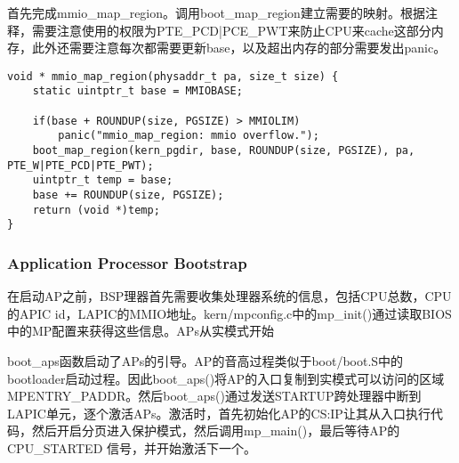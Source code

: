 \begin{exerciseSolution}{1}
    \par 首先完成mmio\_map\_region。调用boot\_map\_region建立需要的映射。根据注释，需要注意使用的权限为PTE\_PCD|PCE\_PWT来防止CPU来cache这部分内存，此外还需要注意每次都需要更新base，以及超出内存的部分需要发出panic。
    \begin{lstlisting}
void * mmio_map_region(physaddr_t pa, size_t size) {
    static uintptr_t base = MMIOBASE;

    if(base + ROUNDUP(size, PGSIZE) > MMIOLIM)
        panic("mmio_map_region: mmio overflow.");
    boot_map_region(kern_pgdir, base, ROUNDUP(size, PGSIZE), pa, PTE_W|PTE_PCD|PTE_PWT);
    uintptr_t temp = base;
    base += ROUNDUP(size, PGSIZE);
    return (void *)temp;
}
    \end{lstlisting}
\end{exerciseSolution}

\subsubsection{Application Processor Bootstrap}
\par 在启动AP之前，BSP理器首先需要收集处理器系统的信息，包括CPU总数，CPU的APIC id，LAPIC的MMIO地址。kern/mpconfig.c中的mp\_init()通过读取BIOS中的MP配置来获得这些信息。APs从实模式开始
\par boot\_aps函数启动了APs的引导。AP的音高过程类似于boot/boot.S中的bootloader启动过程。因此boot\_aps()将AP的入口复制到实模式可以访问的区域MPENTRY\_PADDR。然后boot\_aps()通过发送STARTUP跨处理器中断到LAPIC单元，逐个激活APs。激活时，首先初始化AP的CS:IP让其从入口执行代码，然后开启分页进入保护模式，然后调用mp\_main()，最后等待AP的CPU\_STARTED 信号，并开始激活下一个。

